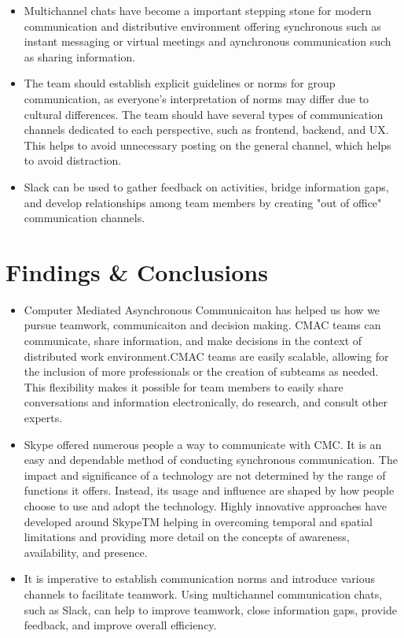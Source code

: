 \documentclass{llncs}
\begin{document}
\begin{itemize}
    \item Multichannel chats have become a important stepping stone for modern communication and distributive environment offering synchronous such as instant messaging or virtual meetings and aynchronous communication such as sharing information.~\cite{refbook1}  \\
    \item The team should establish explicit guidelines or norms for group communication, as everyone's interpretation of norms may differ due to cultural differences. The team should have several types of communication channels dedicated to each perspective, such as frontend, backend, and UX. This helps to avoid unnecessary posting on the general channel, which helps to avoid distraction. \\
    \item Slack can be used to gather feedback on activities, bridge information gaps, and develop relationships among team members by creating "out of office" communication channels.
\end{itemize}


\section{Findings \& Conclusions}

\begin{itemize}
    \item Computer Mediated Asynchronous Communicaiton has helped us how we pursue teamwork, communicaiton and decision making. CMAC teams can communicate, share information, and make decisions in the context of distributed work environment.CMAC teams are easily scalable, allowing for the inclusion of more professionals or the creation of subteams as needed. This flexibility makes it possible for team members to easily share conversations and information electronically, do research, and consult other experts. ~\cite{refpaper6}\\
    \item Skype offered numerous people a way to communicate with CMC. It is an easy and dependable method of conducting synchronous communication. The impact and significance of a technology are not determined by the range of functions it offers. Instead, its usage and influence are shaped by how people choose to use and adopt the technology. Highly innovative approaches have developed around SkypeTM  helping in overcoming  temporal and spatial limitations and providing more detail on the concepts of awareness, availability, and presence.~\cite{refpaper8}\\
    \item It is imperative to establish communication norms and introduce various channels to facilitate teamwork. Using multichannel communication chats, such as Slack, can help to improve teamwork, close information gaps, provide feedback, and improve overall efficiency. ~\cite{refpaper9}

\end{itemize}
\end{document}
